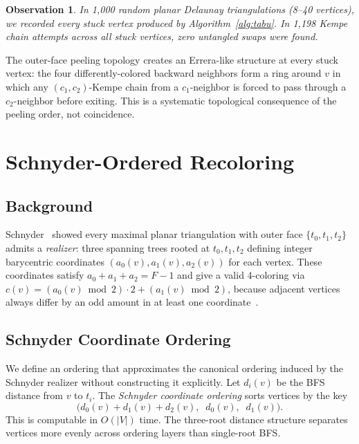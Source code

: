 \documentclass[11pt,twocolumn]{article}
\newtheorem{observation}{Observation}
\begin{document}
\begin{observation}
\label{obs:kempe}
In 1{,}000 random planar Delaunay triangulations (8--40 vertices), we recorded
every stuck vertex produced by Algorithm~\ref{alg:tabu}. In 1{,}198 Kempe chain
attempts across all stuck vertices, \emph{zero} untangled swaps were found.
\end{observation}

The outer-face peeling topology creates an Errera-like structure at every stuck
vertex: the four differently-colored backward neighbors form a ring around $v$
in which any $(c_1,c_2)$-Kempe chain from a $c_1$-neighbor is forced to pass
through a $c_2$-neighbor before exiting. This is a systematic topological
consequence of the peeling order, not coincidence.

\section{Schnyder-Ordered Recoloring}
\label{sec:schnyder}

\subsection{Background}

Schnyder~\cite{schnyder1990} showed every maximal planar triangulation with
outer face $\{t_0,t_1,t_2\}$ admits a \emph{realizer}: three spanning trees
rooted at $t_0,t_1,t_2$ defining integer barycentric coordinates
$(a_0(v),a_1(v),a_2(v))$ for each vertex. These coordinates satisfy
$a_0+a_1+a_2=F-1$ and give a valid 4-coloring via
$c(v)=(a_0(v)\bmod 2)\cdot 2+(a_1(v)\bmod 2)$, because adjacent vertices
always differ by an odd amount in at least one coordinate~\cite{schnyder1990}.

\subsection{Schnyder Coordinate Ordering}

We define an ordering that approximates the canonical ordering induced by the
Schnyder realizer without constructing it explicitly. Let $d_i(v)$ be the BFS
distance from $v$ to $t_i$. The \emph{Schnyder coordinate ordering} sorts
vertices by the key
\[
  \bigl(d_0(v)+d_1(v)+d_2(v),\;\; d_0(v),\;\; d_1(v)\bigr).
\]
This is computable in $O(|V|)$ time. The three-root distance structure separates
vertices more evenly across ordering layers than single-root BFS.
\end{document}
